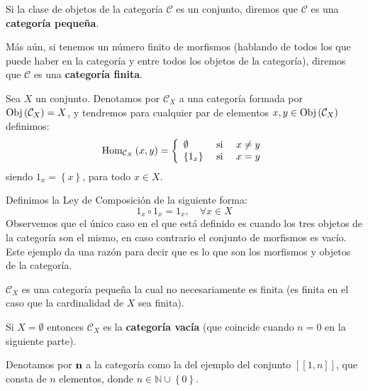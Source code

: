 \documentclass{article}
\newcounter{it}
\theoremstyle{largebreak}
\newcommand\natint[1]{\ensuremath{\left[\!\left[ #1\right]\!\right]}}
\newcommand{\Obj}[1]{\ensuremath{\textup{Obj}\left(#1\right)}}
\newcommand{\Hom}[3]{\ensuremath{\textup{Hom}_{#1}\left(#2,#3\right)}}
\newcommand{\Cat}[1]{\ensuremath{\textup{\textbf{#1}}}}
\begin{document}
    \begin{mydef}
        Si la clase de objetos de la categoría $\mathcal{C}$ es un conjunto, diremos que $\mathcal{C}$ es una \textbf{categoría pequeña}. 
        
        Más aún, si tenemos un número finito de morfismos (hablando de todos los que puede haber en la categoría y entre todos los objetos de la categoría), diremos que $\mathcal{C}$ es una \textbf{categoría finita}.
    \end{mydef}

    \begin{exa}
        Sea $X$ un conjunto. Denotamos por $\mathcal{C}_X$ a una categoría formada por $\Obj{\mathcal{C}_X}=X$, y tendremos para cualquier par de elementos $x,y\in\Obj{\mathcal{C}_X}$ definimos:
        \begin{equation*}
            \Hom{\mathcal{C}_X}{x}{y}=\left\{
                \begin{array}{lcr}
                    \emptyset & \textup{ si } & x\neq y\\
                    \left\{1_x\right\} & \textup{ si } & x=y\\
                \end{array}
            \right.
        \end{equation*}
        siendo $1_x=\left\{x \right\}$, para todo $x\in X$.
        
        Definimos la Ley de Composición de la siguiente forma:
        \begin{equation*}
            1_x\circ 1_x=1_x,\quad\forall x\in X
        \end{equation*}
        Observemos que el único caso en el que está definido es cuando los tres objetos de la categoría son el mismo, en caso contrario el conjunto de morfismos es vacío. Este ejemplo da una razón para decir que es lo que son los morfismos y objetos de la categoría.

        $\mathcal{C}_X$ es una categoría pequeña la cual no necesariamente es finita (es finita en el caso que la cardinalidad de $X$ sea finita).

        Si $X=\emptyset$ entonces $\mathcal{C}_X$ es la \textbf{categoría vacía} (que coincide cuando $n=0$ en la siguiente parte).
    \end{exa}

    \begin{mydef}
        Denotamos por $\Cat{n}$ a la categoría como la del ejemplo del conjunto $\natint{1,n}$, que consta de $n$ elementos, donde $n\in\mathbb{N}\cup\left\{0\right\}$.
    \end{mydef}
    
\end{document}
